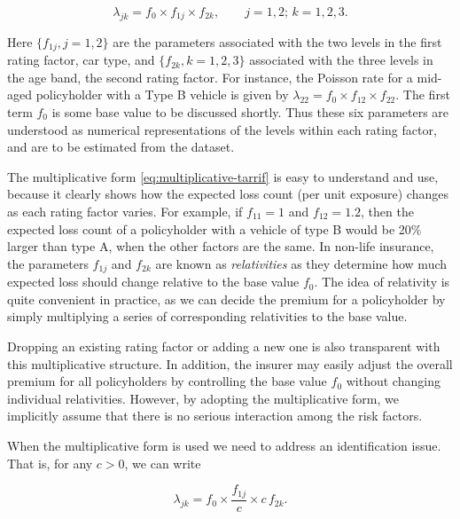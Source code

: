 \documentclass[]{book}
\theoremstyle{definition}
\theoremstyle{definition}
\theoremstyle{definition}
\theoremstyle{remark}
\begin{document}
\begin{equation}
\lambda_{jk}= f_0 \times f_{1j} \times f_{2k}, \qquad j=1,2;\, k=1, 2,3.
\label{eq:multiplicative-tarrif}
\end{equation}

Here \(\{ f_{1j}, j=1,2\}\) are the parameters associated with the two
levels in the first rating factor, car type, and
\(\{ f_{2k}, k=1,2,3\}\) associated with the three levels in the age
band, the second rating factor. For instance, the Poisson rate for a
mid-aged policyholder with a Type B vehicle is given by
\(\lambda_{22}=f_0 \times f_{12} \times f_{22}\). The first term \(f_0\)
is some base value to be discussed shortly. Thus these six parameters
are understood as numerical representations of the levels within each
rating factor, and are to be estimated from the dataset.

The multiplicative form \eqref{eq:multiplicative-tarrif} is easy to
understand and use, because it clearly shows how the expected loss count
(per unit exposure) changes as each rating factor varies. For example,
if \(f_{11}=1\) and \(f_{12}=1.2\), then the expected loss count of a
policyholder with a vehicle of type B would be 20\(\%\) larger than type
A, when the other factors are the same. In non-life insurance, the
parameters \(f_{1j}\) and \(f_{2k}\) are known as \emph{relativities} as
they determine how much expected loss should change relative to the base
value \(f_0\). The idea of relativity is quite convenient in practice,
as we can decide the premium for a policyholder by simply multiplying a
series of corresponding relativities to the base value.

Dropping an existing rating factor or adding a new one is also
transparent with this multiplicative structure. In addition, the insurer
may easily adjust the overall premium for all policyholders by
controlling the base value \(f_0\) without changing individual
relativities. However, by adopting the multiplicative form, we
implicitly assume that there is no serious interaction among the risk
factors.

When the multiplicative form is used we need to address an
identification issue. That is, for any \(c>0\), we can write

\begin{equation}
\lambda_{jk}= f_0 \times \frac{f_{1j}}{c} \times c\,f_{2k}. 
\end{equation}
\end{document}
